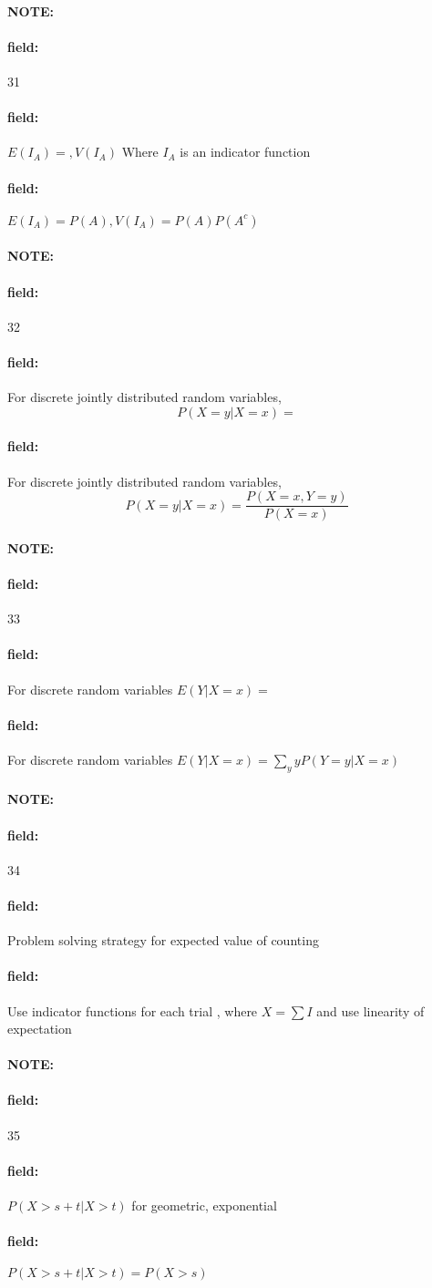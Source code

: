 \documentclass[12pt]{article}
\newenvironment{note}{\paragraph{NOTE:}}{}
\newenvironment{field}{\paragraph{field:}}{}
\begin{document}
\begin{note}
  \begin{field}
    \tiny 31
  \end{field}
  \begin{field}
    $E(I_A) = , V(I_A)$ Where $I_A$ is an indicator function
  \end{field}
  \begin{field}
    $E(I_A) = P(A), V(I_A) = P(A)P(A^c)$
  \end{field}
\end{note}

\begin{note}
  \begin{field}
    \tiny 32
  \end{field}
  \begin{field}
    For discrete jointly distributed random variables,
    $$ P(X = y | X = x) = $$
  \end{field}
  \begin{field}
    For discrete jointly distributed random variables,
    $$ P(X = y | X = x) = \frac{P(X=x,Y=y)}{P(X=x)}$$
  \end{field}
\end{note}

\begin{note}
  \begin{field}
    \tiny 33
  \end{field}
  \begin{field}
    For discrete random variables
    $E(Y|X=x) = $
  \end{field}
  \begin{field}
    For discrete random variables
    $E(Y|X=x) = \sum_y y P(Y = y | X = x)$
  \end{field}
\end{note}

\begin{note}
  \begin{field}
    \tiny 34
  \end{field}
  \begin{field}
    Problem solving strategy for expected value of counting
  \end{field}
  \begin{field}
    Use indicator functions for each trial , where $X = \sum I$ and use linearity of expectation
  \end{field}
\end{note}


\begin{note}
  \begin{field}
    \tiny 35
  \end{field}
  \begin{field}
    $P(X > s + t|X > t)$ for geometric, exponential
  \end{field}
  \begin{field}
    $P(X > s + t|X > t) = P(X > s)$
  \end{field}
\end{note}
\end{document}
